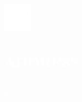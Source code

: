 \documentclass[../main.tex]{subfiles}
\begin{document}
    \hspace*{0.2cm}
    \begin{minipage}[t]{2cm}
        \vspace*{0.75cm}\includegraphics[width=1.5cm]{assets/location.png}
    \end{minipage}
    \begin{minipage}[t]{5cm}

        \vspace*{0.65cm}
        \section*{\textcolor{white}{ADDRESS}}
        \vspace*{-0.25cm}
        \textcolor{white}{
            Mataró, 08301 \\
            Barcelona, Spain
        }
    \end{minipage}
\end{document}
